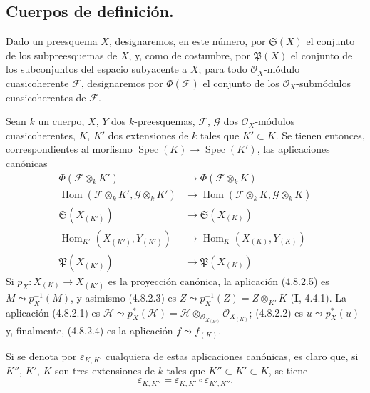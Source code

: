 \subsection{Cuerpos de definición.}
\label{subsection:IV.4.8-fr}

\begin{env}[4.8.1]
\label{IV.2.4.8.1-fr}
Dado un preesquema $X$, designaremos, en este número, por
$\mathfrak S(X)$ el conjunto de los subpreesquemas de $X$, y, como de costumbre,
por $\mathfrak P(X)$ el conjunto de los subconjuntos del espacio subyacente a $X$;
para todo $\mathcal O_X$-módulo cuasicoherente $\mathscr F$, designaremos
por $\Phi(\mathscr F)$ el conjunto de los $\mathcal O_X$-submódulos
cuasicoherentes de $\mathscr F$.
\end{env}

\begin{env}[4.8.2]
\label{IV.2.4.8.2-fr}
Sean $k$ un cuerpo, $X$, $Y$ dos $k$-preesquemas, $\mathscr F$, $\mathscr G$
dos $\mathcal O_X$-módulos cuasicoherentes, $K$, $K'$ dos extensiones de $k$
tales que $K'\subset K$. Se tienen entonces, correspondientes al morfismo
$\operatorname{Spec}(K)\to\operatorname{Spec}(K')$, las aplicaciones
canónicas
\begin{align}
\Phi(\mathscr F\otimes_kK')
&\longrightarrow\Phi(\mathscr F\otimes_kK)
\tag{4.8.2.1}
\label{IV.2.4.8.2.1-fr}\\
\operatorname{Hom}(\mathscr F\otimes_kK',\mathscr G\otimes_kK')
&\longrightarrow
\operatorname{Hom}(\mathscr F\otimes_kK,\mathscr G\otimes_kK)
\tag{4.8.2.2}
\label{IV.2.4.8.2.2-fr}\\
\mathfrak S(X_{(K')})&\longrightarrow\mathfrak S(X_{(K)})
\tag{4.8.2.3}
\label{IV.2.4.8.2.3-fr}\\
\operatorname{Hom}_{K'}(X_{(K')},Y_{(K')})
&\longrightarrow\operatorname{Hom}_K(X_{(K)},Y_{(K)})
\tag{4.8.2.4}
\label{IV.2.4.8.2.4-fr}\\
\mathfrak P(X_{(K')})&\longrightarrow\mathfrak P(X_{(K)})
\tag{4.8.2.5}
\label{IV.2.4.8.2.5-fr}
\end{align}
Si $p_X:X_{(K)}\to X_{(K')}$ es la proyección canónica, la aplicación
(4.8.2.5) es $M\leadsto p_X^{-1}(M)$, y asimismo (4.8.2.3) es
$Z\leadsto p_X^{-1}(Z)=Z\otimes_{K'}K$ (\textbf I, 4.4.1). La aplicación (4.8.2.1)
es
$\mathscr H\leadsto p_X^*(\mathscr H)
=\mathscr H\otimes_{\mathcal O_{X_{(K')}}}\mathcal O_{X_{(K)}}$;
(4.8.2.2) es $u\leadsto p_X^*(u)$ y, finalmente, (4.8.2.4) es la aplicación
$f\leadsto f_{(K)}$.

Si se denota por $\varepsilon_{K,K'}$ cualquiera de estas aplicaciones
canónicas, es claro que, si $K''$, $K'$, $K$ son tres extensiones de $k$
tales que $K''\subset K'\subset K$, se tiene
\begin{equation}
\varepsilon_{K,K''}=\varepsilon_{K,K'}\circ\varepsilon_{K',K''}.
\tag{4.8.2.6}
\label{IV.2.4.8.2.6-fr}
\end{equation}
\end{env}

